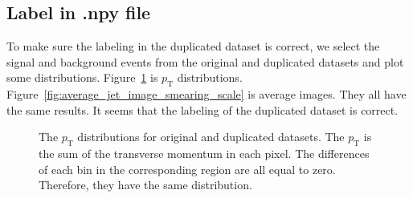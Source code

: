 \documentclass[12pt]{article}
\begin{document}
	\subsection{Label in .npy file}%
	\label{sub:label_in_npy_file}
		To make sure the labeling in the duplicated dataset is correct, we select the signal and background events from the original and duplicated datasets and plot some distributions. Figure~\ref{fig:pt_distribution_at_npy} is $p_{\text{T}}$ distributions. Figure~\ref{fig:average_jet_image_smearing_scale} is average images. They all have the same results. It seems that the labeling of the duplicated dataset is correct.
		\begin{figure}[htpb]
			\centering
			\caption{The $p_{\text{T}}$ distributions for original and duplicated datasets. The $p_{\text{T}}$ is the sum of the transverse momentum in each pixel. The differences of each bin in the corresponding region are all equal to zero. Therefore, they have the same distribution.}
			\label{fig:pt_distribution_at_npy}
		\end{figure}
\end{document}
